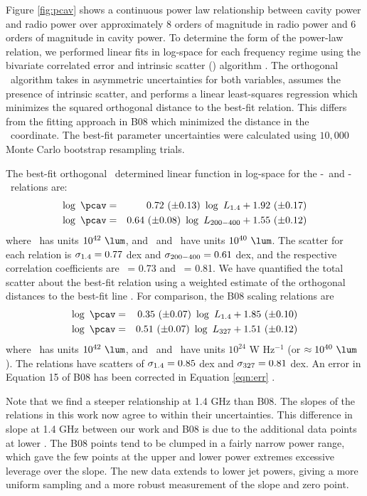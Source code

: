 \documentclass{emulateapj}
\begin{document}
Figure \ref{fig:pcav} shows a continuous power law relationship
between cavity power and radio power over approximately 8 orders of
magnitude in radio power and 6 orders of magnitude in cavity power. To
determine the form of the power-law relation, we performed linear fits
in log-space for each frequency regime using the bivariate correlated
error and intrinsic scatter (\bces) algorithm \citep{bces}. The
orthogonal \bces\ algorithm takes in asymmetric uncertainties for both
variables, assumes the presence of intrinsic scatter, and performs a
linear least-squares regression which minimizes the squared orthogonal
distance to the best-fit relation. This differs from the fitting
approach in B08 which minimized the distance in the
\pcav\ coordinate. The best-fit parameter uncertainties were
calculated using $10,000$ Monte Carlo bootstrap resampling trials.

The best-fit orthogonal \bces\ determined linear function in log-space
for the \pcav-\phigh\ and \pcav-\plow\ relations are:
\begin{eqnarray}
  \log~\pcav &=& 0.72~(\pm 0.13)~\log~\phigh + 1.92~(\pm 0.17) \label{eqn:high}\\
  \log~\pcav &=& 0.64~(\pm 0.08)~\log~\plow + 1.55~(\pm 0.12) \label{eqn:low}
\end{eqnarray}
where \pcav\ has units $10^{42} ~\lum$, and \phigh\ and \plow\ have
units $10^{40} ~\lum$. The scatter for each relation is $\sigma_{\mathrm{1.4}} = 0.77$
dex and $\sigma_{\mathrm{200-400}} = 0.61$ dex, and the respective correlation
coefficients are \rhigh\ = 0.73 and \rlow\ = 0.81. We have quantified
the total scatter about the best-fit relation using a weighted
estimate of the orthogonal distances to the best-fit line
\citep[see][]{2009A&A...498..361P}. For comparison, the
B08 scaling relations are
\begin{eqnarray}
  \log~\pcav &=& 0.35~(\pm 0.07)~\log~\phigh + 1.85~(\pm 0.10) \\
  \log~\pcav &=& 0.51~(\pm 0.07)~\log~\pthree + 1.51~(\pm 0.12) \label{eqn:err}
\end{eqnarray}
where \pcav\ has units $10^{42} ~\lum$, and \phigh\ and \pthree\ have
units $10^{24}$ W Hz$^{-1}$ (or $\approx 10^{40} ~\lum$). The
relations have scatters of $\sigma_{\mathrm{1.4}} = 0.85$ dex and $\sigma_{\mathrm{327}} = 0.81$
dex. An error in Equation 15 of B08 has been corrected in Equation
\ref{eqn:err} \citep{birzan08err}.

Note that we find a steeper relationship at 1.4 GHz than B08.  The
slopes of the relations in this work now agree to within their
uncertainties. This difference in slope at 1.4 GHz between our work
and B08 is due to the additional data points at lower \pjet. The B08
points tend to be clumped in a fairly narrow power range, which gave
the few points at the upper and lower power extremes excessive
leverage over the slope. The new data extends to lower jet powers,
giving a more uniform sampling and a more robust measurement of the
slope and zero point.
\end{document}
